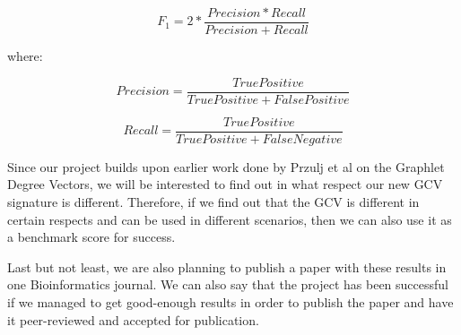 \begin{equation}
 F_1 = 2 * \frac{Precision * Recall}{Precision + Recall}
\end{equation}

where:

$$ Precision = \frac{TruePositive}{TruePositive + FalsePositive}  $$

$$ Recall = \frac{TruePositive}{TruePositive + FalseNegative}  $$


Since our project builds upon earlier work done by Przulj et al on the Graphlet
Degree Vectors\cite{prvzulj2007biological}\cite{milenkoviae2008uncovering}, we
will be interested to find out in what respect our new GCV signature is
different. Therefore, if we find out that the GCV is different in certain
respects and can be used in different scenarios, then we can also use it as a
benchmark score for success.

Last but not least, we are also planning to publish a paper with these results
in one Bioinformatics journal. We can also say that the project has been
successful if we managed to get good-enough results in order to publish the
paper and have it peer-reviewed and accepted for publication.